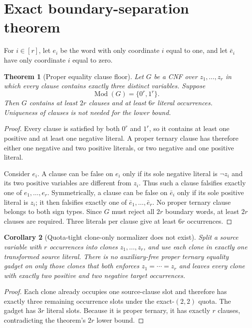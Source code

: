 \documentclass[11pt]{article}
\newtheorem{theorem}{Theorem}
\newtheorem{corollary}[theorem]{Corollary}
\begin{document}
\section{Exact boundary-separation theorem}

For $i\in[r]$, let $e_i$ be the word with only coordinate $i$ equal to
one, and let $\bar e_i$ have only coordinate $i$ equal to zero.

\begin{theorem}[Proper equality clause floor]
Let $G$ be a CNF over $z_1,\ldots,z_r$ in which every clause contains
exactly three distinct variables.  Suppose
\[
   \operatorname{Mod}(G)=\{0^r,1^r\}.
\]
Then $G$ contains at least $2r$ clauses and at least $6r$ literal
occurrences.  Uniqueness of clauses is not needed for the lower bound.
\end{theorem}

\begin{proof}
Every clause is satisfied by both $0^r$ and $1^r$, so it contains at least
one positive and at least one negative literal.  A proper ternary clause has
therefore either one negative and two positive literals, or two negative and
one positive literal.

Consider $e_i$.  A clause can be false on $e_i$ only if its sole negative
literal is $\neg z_i$ and its two positive variables are different from
$z_i$.  Thus such a clause falsifies exactly one of $e_1,\ldots,e_r$.
Symmetrically, a clause can be false on $\bar e_i$ only if its sole positive
literal is $z_i$; it then falsifies exactly one of
$\bar e_1,\ldots,\bar e_r$.  No proper ternary clause belongs to both sign
types.  Since $G$ must reject all $2r$ boundary words, at least $2r$ clauses
are required.  Three literals per clause give at least $6r$ occurrences.
\end{proof}

\begin{corollary}[Quota-tight clone-only normalizer does not exist]
Split a source variable with $r$ occurrences into clones $z_1,\ldots,z_r$,
and use each clone in exactly one transformed source literal.  There is no
auxiliary-free proper ternary equality gadget on only those clones that both
enforces $z_1=\cdots=z_r$ and leaves every clone with exactly two positive
and two negative target occurrences.
\end{corollary}

\begin{proof}
Each clone already occupies one source-clause slot and therefore has exactly
three remaining occurrence slots under the exact-$(2,2)$ quota.  The gadget
has $3r$ literal slots.  Because it is proper ternary, it has exactly $r$
clauses, contradicting the theorem's $2r$ lower bound.
\end{proof}
\end{document}
